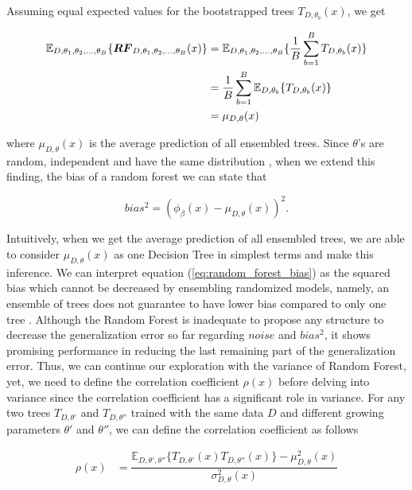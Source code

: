 Assuming equal expected values for the bootstrapped trees  $T_{D, \theta_{b}}(x)$, we get

\begin{align}\label{eq:mu}
\mathbb{E}_{D, \theta_{1}, \theta_{2},..., \theta_{B}}\{\boldsymbol{RF}_{D, \theta_{1},\theta_{2},..., \theta_{B}}(x) \} 
	& = \mathbb{E}_{D, \theta_{1}, \theta_{2},..., \theta_{B}}\{\dfrac{1}{B}\sum_{b = 1}^{B}T_{D,\theta_{b}}(x)\} \notag \\
	& = \dfrac{1}{B}\sum_{b=1}^{B}\mathbb{E}_{D,\theta_{b}}\{T_{D, \theta_{b}}(x)\}\notag \\
	& = \mu_{D,\theta}(x)
\end{align}

where $\mu_{D,\theta}(x)$ is the average prediction of all ensembled trees. Since $\theta$'s are random, 
independent and have the same distribution \cite{louppe2014understanding}, when we extend this finding, 
the bias of a random forest we can state that

\begin{equation}\label{eq:random_forest_bias}
bias^2 = (\phi_{\beta}(x) - \mu_{D,\theta}(x))^2.
\end{equation}

Intuitively, when we get the average prediction of all ensembled trees, 
we are able to consider $\mu_{D,\theta}(x)$ as one Decision Tree in simplest terms and make this inference.
We can interpret equation (\ref{eq:random_forest_bias}) as the squared bias 
which cannot be decreased by ensembling randomized models, namely, 
an ensemble of trees does not guarantee to have lower bias compared to only one tree \cite{friedman2001elements}.
Although the Random Forest is inadequate to propose any structure to decrease the generalization error so far regarding $noise$
and $bias^2$, it shows promising performance in reducing the last remaining part of the generalization error.
Thus, we can continue our exploration with the variance of Random Forest, yet, 
we need to define the correlation coefficient $\rho(x)$
before delving into variance since the correlation coefficient has a significant role in variance. 
For any two trees $T_{D,\theta'}$ and $T_{D,\theta''}$ trained with the same data $D$
and different growing parameters $\theta'$ and $\theta''$, we can define the correlation coefficient as follows

\begin{align}
	\rho(x) & 
	= \dfrac{\mathbb{E}_{D,\theta',\theta''}\{T_{D,\theta'}(x) T_{D,\theta''}(x)\} 
	- \mu_{D,\theta}^2(x)}{\sigma_{D,\theta}^2(x)}
\end{align}


